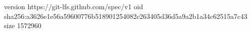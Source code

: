 version https://git-lfs.github.com/spec/v1
oid sha256:a3626e1e56a59600776b518901254082c263405d36d5a9a2b1a34c62515a7c43
size 1572960
